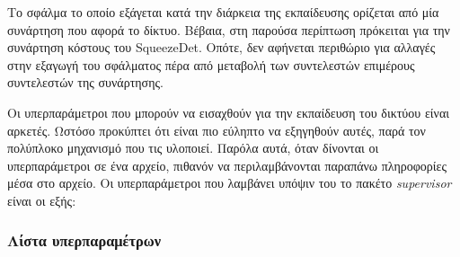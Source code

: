 Το σφάλμα το οποίο εξάγεται κατά την διάρκεια της εκπαίδευσης ορίζεται από μία συνάρτηση που αφορά το δίκτυο. Βέβαια, στη παρούσα περίπτωση πρόκειται για την συνάρτηση κόστους του SqueezeDet. Οπότε, δεν αφήνεται περιθώριο για αλλαγές στην εξαγωγή του σφάλματος πέρα από μεταβολή των συντελεστών επιμέρους συντελεστών της συνάρτησης.

Οι υπερπαράμετροι που μπορούν να εισαχθούν για την εκπαίδευση του δικτύου είναι αρκετές. Ωστόσο προκύπτει ότι είναι πιο εύληπτο να εξηγηθούν αυτές, παρά τον πολύπλοκο μηχανισμό που τις υλοποιεί. Παρόλα αυτά, όταν δίνονται οι υπερπαράμετροι σε ένα αρχείο, πιθανόν να περιλαμβάνονται παραπάνω πληροφορίες μέσα στο αρχείο. Οι υπερπαράμετροι που λαμβάνει υπόψιν του το πακέτο \textit{supervisor} είναι οι εξής:

\subsubsection{Λίστα υπερπαραμέτρων}
